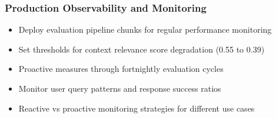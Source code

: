 \begin{frame}[fragile]\frametitle{Production Observability and Monitoring}
      \begin{itemize}
	\item Deploy evaluation pipeline chunks for regular performance monitoring
	\item Set thresholds for context relevance score degradation (0.55 to 0.39)
	\item Proactive measures through fortnightly evaluation cycles
	\item Monitor user query patterns and response success ratios
	\item Reactive vs proactive monitoring strategies for different use cases
	  \end{itemize}
\end{frame}